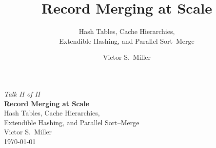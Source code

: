\documentclass[aspectratio=169,t]{beamer}
\title{Record Merging at Scale}
\subtitle{Hash Tables, Cache Hierarchies,\\Extendible Hashing, and Parallel Sort--Merge}
\author{Victor S.\ Miller}
\date{}
\begin{document}
{
\begin{frame}[plain]
  \vspace{0.8cm}
  \begin{center}
    {\color{lightblue}\small\itshape Talk II of II}\\[0.5cm]
    {\color{white}\LARGE\bfseries Record Merging at Scale}\\[0.5cm]
    {\color{lightblue}\large Hash Tables, Cache Hierarchies,\\[3pt]
     Extendible Hashing, and Parallel Sort--Merge}\\[0.8cm]
    {\color{white}\large Victor S.\ Miller}\\[0.3cm]
    {\color{lightblue!70}\normalsize \today}
  \end{center}
\end{frame}
}
\end{document}
